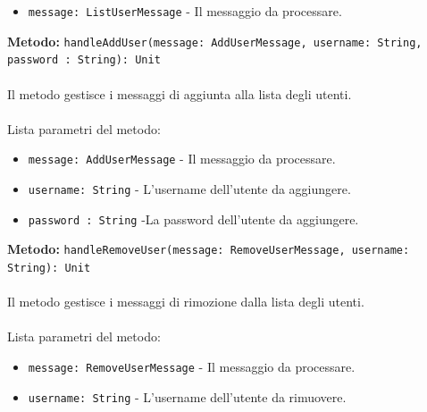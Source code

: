 \documentclass[a4paper]{article}
\begin{document}
			\begin{itemize}
				\item \texttt{message: ListUserMessage} - Il messaggio da processare.
			\end{itemize}	
		\textbf{Metodo: }\texttt{handleAddUser(message: AddUserMessage, username: String, password : String): Unit}
			\\ \\
			Il metodo gestisce i messaggi di aggiunta alla lista degli utenti.
			\\ \\
			Lista parametri del metodo:
			\begin{itemize}
				\item \texttt{message: AddUserMessage} - Il messaggio da processare.
				\item \texttt{username: String} - L'username dell'utente da aggiungere.
				\item \texttt{password : String} -La password dell'utente da aggiungere.
			\end{itemize}	
		\textbf{Metodo: }\texttt{handleRemoveUser(message: RemoveUserMessage, username: String): Unit}
			\\ \\
			Il metodo gestisce i messaggi di rimozione dalla lista degli utenti.
			\\ \\
			Lista parametri del metodo:
			\begin{itemize}
				\item \texttt{message: RemoveUserMessage} - Il messaggio da processare.
				\item \texttt{username: String} - L'username dell'utente da rimuovere.
			\end{itemize}
			
\end{document}
